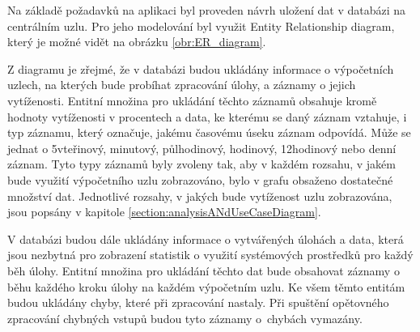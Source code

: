 Na základě požadavků na aplikaci byl proveden návrh uložení dat v databázi na centrálním uzlu. Pro jeho modelování byl využit Entity Relationship diagram, který je možné vidět na obrázku \ref{obr:ER_diagram}.

Z diagramu je zřejmé, že v databázi budou ukládány informace o výpočetních uzlech, na kterých bude probíhat zpracování úlohy, a záznamy o jejich vytíženosti. Entitní množina pro ukládání těchto záznamů obsahuje kromě hodnoty vytíženosti v procentech a data, ke kterému se daný záznam vztahuje, i typ záznamu, který označuje, jakému časovému úseku záznam odpovídá. Může se jednat o 5vteřinový, minutový, půlhodinový, hodinový, 12hodinový nebo denní záznam. Tyto typy záznamů byly zvoleny tak, aby v každém rozsahu, v jakém bude využití výpočetního uzlu zobrazováno, bylo v grafu obsaženo dostatečné množství dat. Jednotlivé rozsahy, v jakých bude vytíženost uzlu zobrazována, jsou popsány v kapitole \ref{section:analysisANdUseCaseDiagram}. 

V databázi budou dále ukládány informace o vytvářených úlohách a data, která jsou nezbytná pro zobrazení statistik o využití systémových prostředků pro každý běh úlohy. Entitní množina pro ukládání těchto dat bude obsahovat záznamy o běhu každého kroku úlohy na každém výpočetním uzlu. Ke všem těmto entitám budou ukládány chyby, které při zpracování nastaly. Při spuštění opětovného zpracování chybných vstupů budou tyto záznamy o~chybách vymazány.

